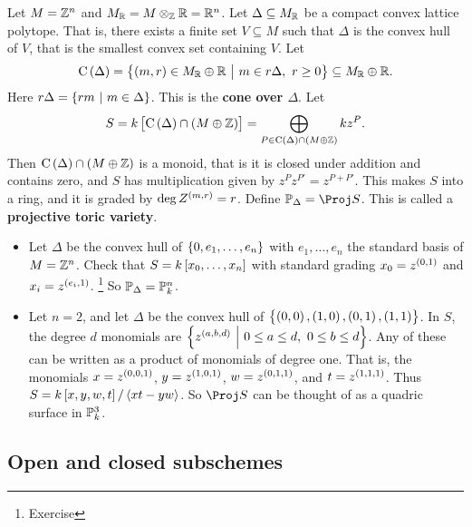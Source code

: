 \pagebreak

\begin{example*}
Let $ M = \mathbb{Z}^n $ and $ M_{\mathbb{R}} = M \otimes_{\mathbb{Z}} \mathbb{R} = \mathbb{R}^n $. Let $ \Delta \subseteq M_{\mathbb{R}} $ be a compact convex lattice polytope. That is, there exists a finite set $ V \subseteq M $ such that $ \Delta $ is the convex hull of $ V $, that is the smallest convex set containing $ V $. Let
$$ \C\br{\Delta} = \cbr{\br{m, r} \in M_\RR \oplus \RR \st m \in r\Delta, \ r \ge 0} \subseteq M_\RR \oplus \RR. $$
Here $ r\Delta = \cbr{rm \st m \in \Delta} $. This is the \textbf{cone over $ \Delta $}. Let
$$ S = k\sbr{\C\br{\Delta} \cap \br{M \oplus \ZZ}} = \bigoplus_{P \in \C\br{\Delta} \cap \br{M \oplus \ZZ}} kz^P. $$
Then $ \C\br{\Delta} \cap \br{M \oplus \ZZ} $ is a monoid, that is it is closed under addition and contains zero, and $ S $ has multiplication given by $ z^Pz^{P'} = z^{P + P'} $. This makes $ S $ into a ring, and it is graded by $ \deg Z^{\br{m, r}} = r $. Define $ \PP_\Delta = \Proj S $. This is called a \textbf{projective toric variety}.
\begin{itemize}
\item Let $ \Delta $ be the convex hull of $ \cbr{0, e_1, \dots, e_n} $ with $ e_1, \dots, e_n $ the standard basis of $ M = \mathbb{Z}^n $. Check that $ S = k\sbr{x_0, \dots, x_n} $ with standard grading $ x_0 = z^{\br{0, 1}} $ and $ x_i = z^{\br{e_i, 1}} $. \footnote{Exercise} So $ \mathbb{P}_\Delta = \mathbb{P}_k^n $.
\item Let $ n = 2 $, and let $ \Delta $ be the convex hull of $ \cbr{\br{0, 0}, \br{1, 0}, \br{0, 1}, \br{1, 1}} $. In $ S $, the degree $ d $ monomials are $ \cbr{z^{\br{a, b, d}} \st 0 \le a \le d, \ 0 \le b \le d} $. Any of these can be written as a product of monomials of degree one. That is, the monomials $ x = z^{\br{0, 0, 1}} $, $ y = z^{\br{1, 0, 1}} $, $ w = z^{\br{0, 1, 1}} $, and $ t = z^{\br{1, 1, 1}} $. Thus $ S = k\sbr{x, y, w, t} / \abr{xt - yw} $. So $ \Proj S $ can be thought of as a quadric surface in $ \mathbb{P}_k^3 $.
\end{itemize}
\end{example*}

\subsection{Open and closed subschemes}



